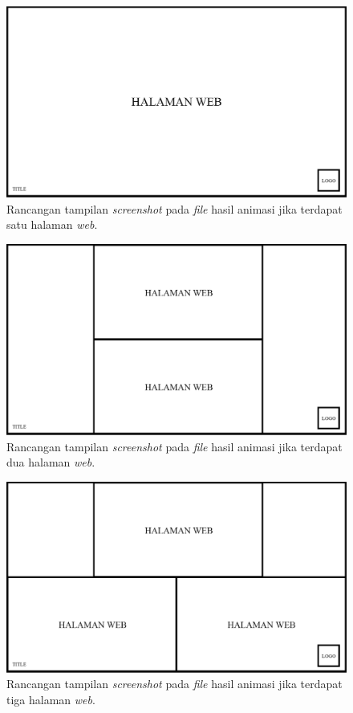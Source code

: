 \begin{figure}[H]
	\centering
		\includegraphics[scale=0.3]{Gambar/output_1.png}
	\caption{Rancangan tampilan \textit{screenshot} pada \textit{file} hasil animasi jika terdapat satu halaman \textit{web}.}
	\label{fig:output1}
\end{figure}

\begin{figure}[H]
	\centering
		\includegraphics[scale=0.3]{Gambar/output_2.png}
	\caption{Rancangan tampilan \textit{screenshot} pada \textit{file} hasil animasi jika terdapat dua halaman \textit{web}.}
	\label{fig:output2}
\end{figure}

\begin{figure}[H]
	\centering
		\includegraphics[scale=0.3]{Gambar/output_3.png}
	\caption{Rancangan tampilan \textit{screenshot} pada \textit{file} hasil animasi jika terdapat tiga halaman \textit{web}.}
	\label{fig:output3}
\end{figure}

